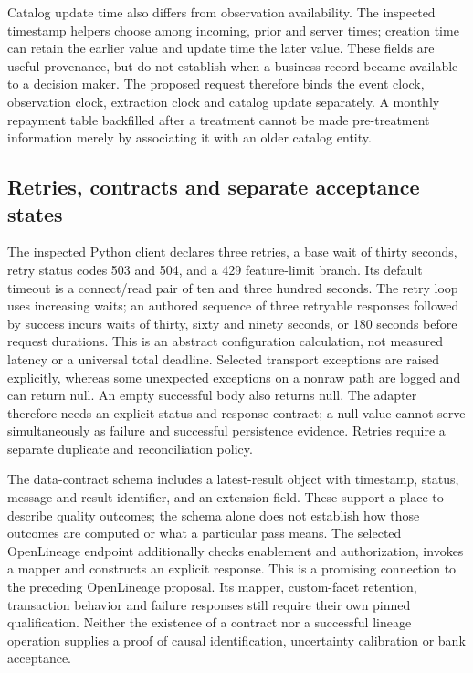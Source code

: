 Catalog update time also differs from observation availability. The inspected
timestamp helpers choose among incoming, prior and server times; creation time
can retain the earlier value and update time the later value. These fields are
useful provenance, but do not establish when a business record became available
to a decision maker. The proposed request therefore binds the event clock,
observation clock, extraction clock and catalog update separately. A monthly
repayment table backfilled after a treatment cannot be made pre-treatment
information merely by associating it with an older catalog entity.
\citep{exec24_openmetadata_source}

\subsection{Retries, contracts and separate acceptance states}

The inspected Python client declares three retries, a base wait of thirty
seconds, retry status codes 503 and 504, and a 429 feature-limit branch. Its
default timeout is a connect/read pair of ten and three hundred seconds.
The retry loop uses increasing waits; an authored sequence of three retryable
responses followed by success incurs waits of thirty, sixty and ninety seconds,
or 180 seconds before request durations. This is an abstract configuration
calculation, not measured latency or a universal total deadline. Selected
transport exceptions are raised explicitly, whereas some unexpected exceptions
on a nonraw path are logged and can return null. An empty successful body also
returns null. The adapter therefore needs an explicit status and response
contract; a null value cannot serve simultaneously as failure and successful
persistence evidence. Retries require a separate duplicate and reconciliation
policy.\citep{exec24_openmetadata_source,exec24_openmetadata_reference}

The data-contract schema includes a latest-result object with timestamp, status,
message and result identifier, and an extension field. These support a place
to describe quality outcomes; the schema alone does not establish how those
outcomes are computed or what a particular pass means. The selected OpenLineage
endpoint additionally checks enablement and authorization, invokes a mapper and
constructs an explicit response. This is a promising connection to the preceding
OpenLineage proposal. Its mapper, custom-facet retention, transaction behavior and
failure responses still require their own pinned qualification. Neither the
existence of a contract nor a successful lineage operation supplies a proof of
causal identification, uncertainty calibration or bank acceptance.
\citep{exec24_openmetadata_source}

